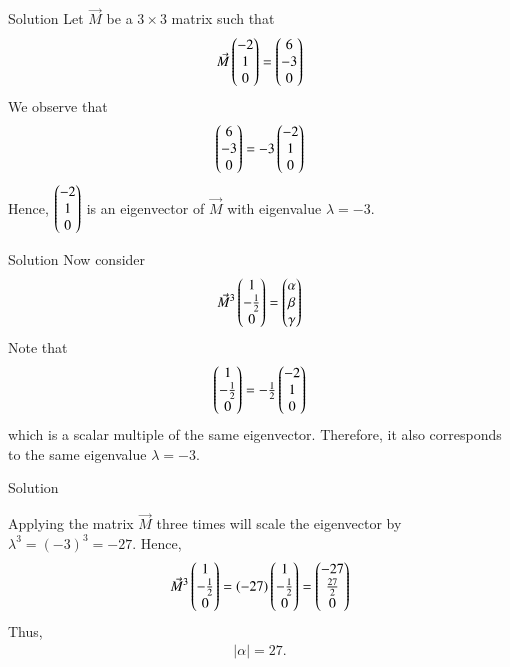 \documentclass{beamer}
\begin{document}
\begin{frame}{Solution}
    Let $\Vec{M}$ be a $3\times3$ matrix such that
    \begin{align}
        \Vec{M}\begin{pmatrix}-2\\1\\0\end{pmatrix} = \begin{pmatrix}6\\-3\\0\end{pmatrix}
    \end{align}
    We observe that
    \begin{align}
        \begin{pmatrix}6\\-3\\0\end{pmatrix} = -3\begin{pmatrix}-2\\1\\0\end{pmatrix}
    \end{align}
    Hence, $\begin{pmatrix}-2\\1\\0\end{pmatrix}$ is an eigenvector of $\Vec{M}$ with eigenvalue $\lambda = -3$.

    \vspace{0.4cm}
    \end{frame}
    \begin{frame}{Solution}
    Now consider
    \begin{align}
        \Vec{M}^3\begin{pmatrix}1\\-\tfrac{1}{2}\\0\end{pmatrix} = \begin{pmatrix}\alpha\\\beta\\\gamma\end{pmatrix}
    \end{align}
    Note that
    \begin{align}
        \begin{pmatrix}1\\-\tfrac{1}{2}\\0\end{pmatrix} = -\tfrac{1}{2}\begin{pmatrix}-2\\1\\0\end{pmatrix}
    \end{align}
    which is a scalar multiple of the same eigenvector.  
    Therefore, it also corresponds to the same eigenvalue $\lambda = -3$.

    \vspace{0.4cm}
    \end{frame}
    \begin{frame}{Solution}
        
    
    Applying the matrix $\Vec{M}$ three times will scale the eigenvector by $\lambda^3 = (-3)^3 = -27$.
    Hence,
    \begin{align}
        \Vec{M}^3\begin{pmatrix}1\\-\tfrac{1}{2}\\0\end{pmatrix}
        = (-27)\begin{pmatrix}1\\-\tfrac{1}{2}\\0\end{pmatrix}
        = \begin{pmatrix}-27\\\tfrac{27}{2}\\0\end{pmatrix}
    \end{align}
    Thus,
    \begin{align}
        \boxed{|\alpha| = 27.}
    \end{align}
\end{frame}
\end{document}
